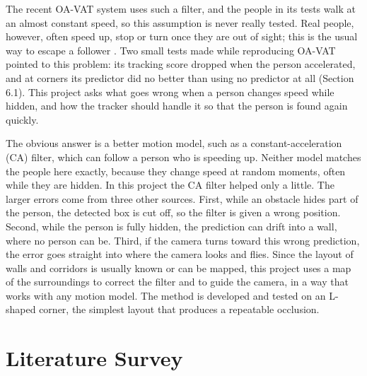 \documentclass[12pt,a4paper]{article}
\begin{document}
The recent OA-VAT system \cite{r3} uses such a filter, and the people in its tests walk at an almost constant speed, so this assumption is never really tested.
Real people, however, often speed up, stop or turn once they are out of sight; this is the usual way to escape a follower \cite{r4}.
Two small tests made while reproducing OA-VAT pointed to this problem: its tracking score dropped when the person accelerated, and at corners its predictor did no better than using no predictor at all (Section 6.1).
This project asks what goes wrong when a person changes speed while hidden, and how the tracker should handle it so that the person is found again quickly.

The obvious answer is a better motion model, such as a constant-acceleration (CA) filter, which can follow a person who is speeding up.
Neither model matches the people here exactly, because they change speed at random moments, often while they are hidden.
In this project the CA filter helped only a little.
The larger errors come from three other sources.
First, while an obstacle hides part of the person, the detected box is cut off, so the filter is given a wrong position.
Second, while the person is fully hidden, the prediction can drift into a wall, where no person can be.
Third, if the camera turns toward this wrong prediction, the error goes straight into where the camera looks and flies.
Since the layout of walls and corridors is usually known or can be mapped, this project uses a map of the surroundings to correct the filter and to guide the camera, in a way that works with any motion model.
The method is developed and tested on an L-shaped corner, the simplest layout that produces a repeatable occlusion.

\section{Literature Survey}
\end{document}
